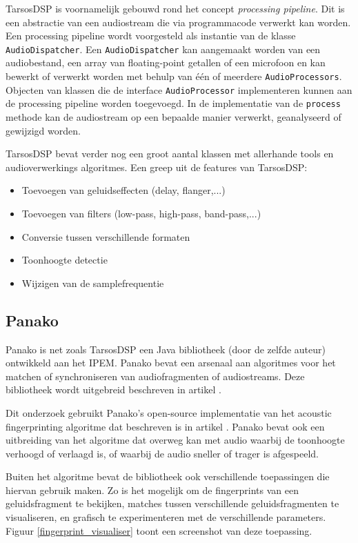 TarsosDSP is voornamelijk gebouwd rond het concept \textit{processing pipeline}. Dit is een abstractie van een audiostream die via programmacode verwerkt kan worden. Een processing pipeline wordt voorgesteld als instantie van de klasse \texttt{AudioDispatcher}. Een \texttt{AudioDispatcher} kan aangemaakt worden van een audiobestand, een array van floating-point getallen of een microfoon en kan bewerkt of verwerkt worden met behulp van één of meerdere \texttt{AudioProcessors}. Objecten van klassen die de interface \texttt{AudioProcessor} implementeren kunnen aan de processing pipeline worden toegevoegd. In de implementatie van de \texttt{process} methode kan de audiostream op een bepaalde manier verwerkt, geanalyseerd of gewijzigd worden.

TarsosDSP bevat verder nog een groot aantal klassen met allerhande tools en audioverwerkings algoritmes. Een greep uit de features van TarsosDSP:
\begin{itemize}[noitemsep]
	\item Toevoegen van geluidseffecten (delay, flanger,...)
	\item Toevoegen van filters (low-pass, high-pass, band-pass,...)
	\item Conversie tussen verschillende formaten
	\item Toonhoogte detectie
	\item Wijzigen van de samplefrequentie
\end{itemize}

\subsection{Panako}

Panako is net zoals TarsosDSP een Java bibliotheek (door de zelfde auteur) ontwikkeld aan het IPEM. Panako bevat een arsenaal aan algoritmes voor het matchen of synchroniseren van audiofragmenten of audiostreams.  Deze bibliotheek wordt uitgebreid beschreven in artikel \cite{six2014panako}.

Dit onderzoek gebruikt Panako's open-source implementatie van het acoustic fingerprinting algoritme dat beschreven is in artikel \cite{Wang2003a}. Panako bevat ook een uitbreiding van het algoritme dat overweg kan met audio waarbij de toonhoogte verhoogd of verlaagd is, of waarbij de audio sneller of trager is afgespeeld.

Buiten het algoritme bevat de bibliotheek ook verschillende toepassingen die hiervan gebruik maken. Zo is het mogelijk om de fingerprints van een geluidsfragment te bekijken, matches tussen verschillende geluidsfragmenten te visualiseren, en grafisch te experimenteren met de verschillende parameters. Figuur \ref{fingerprint_visualiser} toont een screenshot van deze toepassing.


